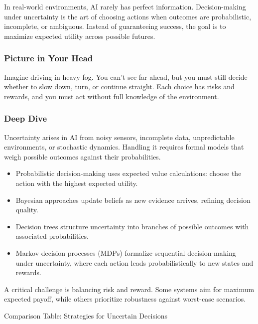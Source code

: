 \documentclass[
  letterpaper,
  DIV=11,
  numbers=noendperiod]{scrreprt}
\providecommand{\tightlist}{%
  \setlength{\itemsep}{0pt}\setlength{\parskip}{0pt}}
\begin{document}
In real-world environments, AI rarely has perfect information.
Decision-making under uncertainty is the art of choosing actions when
outcomes are probabilistic, incomplete, or ambiguous. Instead of
guaranteeing success, the goal is to maximize expected utility across
possible futures.

\subsubsection{Picture in Your Head}\label{picture-in-your-head-67}

Imagine driving in heavy fog. You can't see far ahead, but you must
still decide whether to slow down, turn, or continue straight. Each
choice has risks and rewards, and you must act without full knowledge of
the environment.

\subsubsection{Deep Dive}\label{deep-dive-67}

Uncertainty arises in AI from noisy sensors, incomplete data,
unpredictable environments, or stochastic dynamics. Handling it requires
formal models that weigh possible outcomes against their probabilities.

\begin{itemize}
\tightlist
\item
  Probabilistic decision-making uses expected value calculations: choose
  the action with the highest expected utility.
\item
  Bayesian approaches update beliefs as new evidence arrives, refining
  decision quality.
\item
  Decision trees structure uncertainty into branches of possible
  outcomes with associated probabilities.
\item
  Markov decision processes (MDPs) formalize sequential decision-making
  under uncertainty, where each action leads probabilistically to new
  states and rewards.
\end{itemize}

A critical challenge is balancing risk and reward. Some systems aim for
maximum expected payoff, while others prioritize robustness against
worst-case scenarios.

Comparison Table: Strategies for Uncertain Decisions
\end{document}
